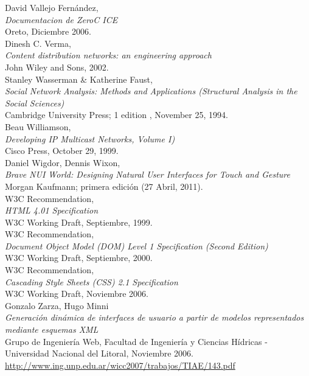 \begin{thebibliography}{XXX}
     David Vallejo Fernández,\\
    \newblock \emph{Documentacion de ZeroC ICE}\\
    Oreto, Diciembre 2006.\\
    
     Dinesh C. Verma,\\
    \newblock \emph{Content distribution networks: an engineering approach}\\
    John Wiley and Sons, 2002.\\
        
     Stanley Wasserman \& Katherine Faust,\\
    \newblock \emph{Social Network Analysis: Methods and Applications (Structural
    Analysis in the Social Sciences)}\\
    Cambridge University Press; 1 edition , November 25, 1994.\\
    
     Beau Williamson,\\
    \newblock \emph{Developing IP Multicast Networks, Volume I)}\\
    Cisco Press, October 29, 1999.\\
    
     Daniel Wigdor, Dennis Wixon,\\ 
    \newblock \emph{Brave NUI World: Designing Natural User Interfaces for Touch and Gesture}\\
     Morgan Kaufmann; primera edición (27 Abril, 2011).\\
    
     W3C Recommendation,\\
    \newblock \emph{HTML 4.01 Specification}\\
    W3C Working Draft, Septiembre, 1999.\\

     W3C Recommendation,\\
    \newblock \emph{Document Object Model (DOM) Level 1 Specification (Second Edition)}\\
    W3C Working Draft, Septiembre, 2000.\\
    
     W3C Recommendation,\\
    \newblock \emph{Cascading Style Sheets (CSS) 2.1 Specification}\\
    W3C Working Draft, Noviembre 2006.\\
    
     Gonzalo Zarza, Hugo Minni\\
    \newblock \emph{Generación dinámica de interfaces de usuario a partir de
modelos representados mediante esquemas XML}\\
    Grupo de Ingeniería Web, Facultad de Ingeniería y Ciencias Hídricas -
    Universidad Nacional del Litoral, Noviembre 2006.\\
    \url{http://www.ing.unp.edu.ar/wicc2007/trabajos/TIAE/143.pdf}
    
\end{thebibliography}

\cleardoublepage